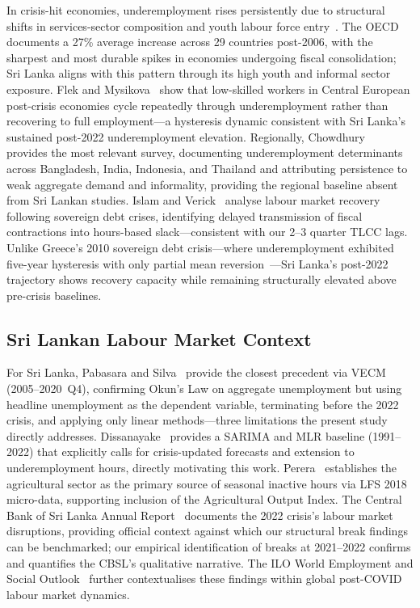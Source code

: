 \documentclass[sigconf]{acmart}
\begin{document}
In crisis-hit economies, underemployment rises persistently due to structural
shifts in services-sector composition and youth labour force
entry~\cite{oecd2017}. The OECD~\cite{oecd2017} documents a 27\% average
increase across 29 countries post-2006, with the sharpest and most durable
spikes in economies undergoing fiscal consolidation; Sri Lanka aligns with
this pattern through its high youth and informal sector exposure. Flek and
Mysikova~\cite{flek2015} show that low-skilled workers in Central European
post-crisis economies cycle repeatedly through underemployment rather than
recovering to full employment---a hysteresis dynamic consistent with Sri
Lanka's sustained post-2022 underemployment elevation. Regionally,
Chowdhury~\cite{chowdhury2009} provides the most relevant survey,
documenting underemployment determinants across Bangladesh, India, Indonesia,
and Thailand and attributing persistence to weak aggregate demand and
informality, providing the regional baseline absent from Sri Lankan
studies. Islam and Verick~\cite{islam2011} analyse labour market recovery
following sovereign debt crises, identifying delayed transmission of fiscal
contractions into hours-based slack---consistent with our 2--3 quarter TLCC
lags. Unlike Greece's 2010 sovereign debt crisis---where underemployment
exhibited five-year hysteresis with only partial mean
reversion~\cite{oecd2017}---Sri Lanka's post-2022 trajectory shows recovery
capacity while remaining structurally elevated above pre-crisis baselines.
 
\subsection{Sri Lankan Labour Market Context}
 
For Sri Lanka, Pabasara and Silva~\cite{pabasara2025impact} provide the
closest precedent via VECM (2005--2020~Q4), confirming Okun's Law on
aggregate unemployment but using headline unemployment as the dependent
variable, terminating before the 2022 crisis, and applying only linear
methods---three limitations the present study directly addresses.
Dissanayake~\cite{dissanayake2026} provides a SARIMA and MLR baseline
(1991--2022) that explicitly calls for crisis-updated forecasts and
extension to underemployment hours, directly motivating this work.
Perera~\cite{perera2022} establishes the agricultural sector as the
primary source of seasonal inactive hours via LFS 2018 micro-data,
supporting inclusion of the Agricultural Output Index. The Central Bank
of Sri Lanka Annual Report~\cite{cbsl2025} documents the 2022 crisis's
labour market disruptions, providing official context against which our
structural break findings can be benchmarked; our empirical identification
of breaks at 2021--2022 confirms and quantifies the CBSL's qualitative
narrative. The ILO World Employment and Social Outlook~\cite{iloweso2024}
further contextualises these findings within global post-COVID labour
market dynamics.
 
\end{document}
